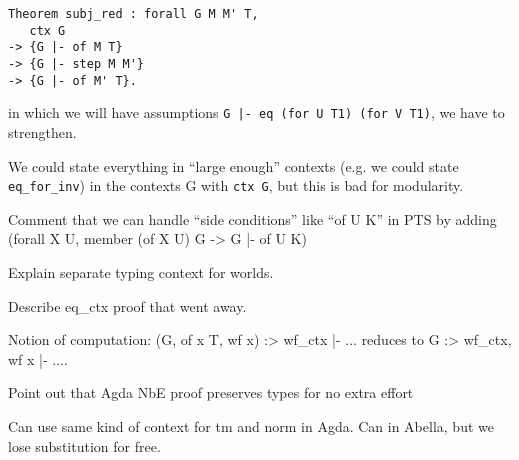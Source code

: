 \documentclass{article}
\begin{document}
\begin{verbatim}
Theorem subj_red : forall G M M' T,
   ctx G
-> {G |- of M T}
-> {G |- step M M'}
-> {G |- of M' T}.
\end{verbatim}

in which we will have assumptions
{\tt {G |- eq (for U T1) (for V T1)}}, we have to strengthen.

We could state everything in ``large enough'' contexts (e.g. we could
state {\tt eq\_for\_inv}) in the contexts G with {\tt ctx G}, but this is
bad for modularity.

Comment that we can handle ``side conditions'' like ``of U K'' in PTS
by adding (forall X U, member (of X U) G -> {G |- of U K})

Explain separate typing context for worlds.

Describe eq\_ctx proof that went away.

Notion of computation: { (G, of x T, wf x) :> wf\_ctx |- ...} reduces
to { G :> wf\_ctx, wf x |- ...}.

Point out that Agda NbE proof preserves types for no extra effort

Can use same kind of context for tm and norm in Agda. Can in Abella,
but we lose substitution for free.
\end{document}
